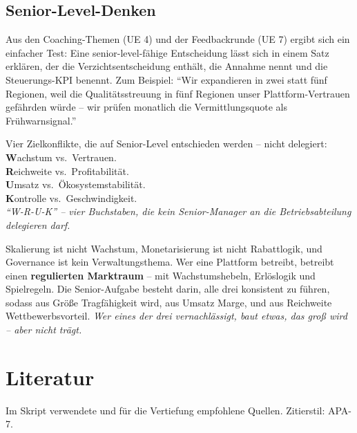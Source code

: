 \documentclass[11pt,a4paper,oneside]{article}
\newcommand{\caveatfontfallback}{\itshape}
\newcommand\caveatfont{\caveatfontfallback}%
\newcommand{\akzent}[1]{{\caveatfont\color{lpAmber}#1}}
\begin{document}
\subsection{Senior-Level-Denken}

Aus den Coaching-Themen (UE 4) und der Feedbackrunde (UE 7) ergibt sich ein einfacher Test: Eine senior-level-fähige Entscheidung lässt sich in einem Satz erklären, der die Verzichtsentscheidung enthält, die Annahme nennt und die Steuerungs-KPI benennt. Zum Beispiel: ``Wir expandieren in zwei statt fünf Regionen, weil die Qualitätsstreuung in fünf Regionen unser Plattform-Vertrauen gefährden würde -- wir prüfen monatlich die Vermittlungsquote als Frühwarnsignal.''

\begin{eselsbox}[Eselsbrücke: \akzent{W-R-U-K}]
Vier Zielkonflikte, die auf Senior-Level entschieden werden -- nicht delegiert:\\[2pt]
\textbf{W}achstum vs.\ Vertrauen.\\
\textbf{R}eichweite vs.\ Profitabilität.\\
\textbf{U}msatz vs.\ Ökosystemstabilität.\\
\textbf{K}ontrolle vs.\ Geschwindigkeit.\\[2pt]
\emph{``W-R-U-K'' -- vier Buchstaben, die kein Senior-Manager an die Betriebsabteilung delegieren darf.}
\end{eselsbox}

\begin{merkbox}
Skalierung ist nicht Wachstum, Monetarisierung ist nicht Rabattlogik, und Governance ist kein Verwaltungsthema. Wer eine Plattform betreibt, betreibt einen \textbf{regulierten Marktraum} -- mit Wachstumshebeln, Erlöslogik und Spielregeln. Die Senior-Aufgabe besteht darin, alle drei konsistent zu führen, sodass aus Größe Tragfähigkeit wird, aus Umsatz Marge, und aus Reichweite Wettbewerbsvorteil. \emph{Wer eines der drei vernachlässigt, baut etwas, das groß wird -- aber nicht trägt.}
\end{merkbox}

\clearpage
\section{Literatur}

Im Skript verwendete und für die Vertiefung empfohlene Quellen. Zitierstil: APA-7.
\end{document}
